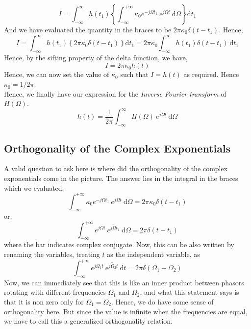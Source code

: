 \[
I = \int_{-\infty}^{\infty} \! h(t_1) \left\lbrace \int_{-\infty}^{+\infty} \! \kappa_0 e^{-j\Omega t_1} \  e^{j\Omega t} \ \mathrm{d}\Omega \right\rbrace \mathrm{d}t_1
\]
And we have evaluated the quantity in the braces to be $2\pi\kappa_0\delta(t-t_1)$. Hence,
\[
I = \int_{-\infty}^{\infty} \! h(t_1)\left\lbrace 2\pi\kappa_0\delta(t-t_1) \right\rbrace \mathrm{d}t_1 = 2\pi\kappa_0 \int_{-\infty}^{\infty} \! h(t_1) \delta(t-t_1)\ \mathrm{d}t_1
\]
Hence, by the sifting property of the delta function, we have,
\[
I = 2\pi\kappa_0 h(t)
\]
Hence, we can now set the value of $\kappa_0$ such that $I = h(t)$ as required. Hence $\kappa_0 = 1/2\pi$.\\
Hence, we finally have our expression for the \emph{Inverse Fourier transform} of $H(\Omega)$.
\[
h(t) = \frac{1}{2\pi}\int_{-\infty}^{\infty} \! H(\Omega)\  e^{j\Omega t} \ \mathrm{d}\Omega
\]
\subsection{Orthogonality of the Complex Exponentials}
A valid question to ask here is where did the orthogonality of the complex exponentials come in the picture. The answer lies in the integral in the braces which we evaluated.
\[
\int_{-\infty}^{+\infty} \! \kappa_0 e^{-j\Omega t_1} \  e^{j\Omega t} \ \mathrm{d}\Omega = 2\pi\kappa_0 \delta(t-t_1)
\]
or,
\[
\int_{-\infty}^{+\infty} \! e^{j\Omega t} \ \overline{e^{j\Omega t_1}} \ \mathrm{d}\Omega = 2\pi \delta(t-t_1)
\]
where the bar indicates complex conjugate. Now, this can be also written by renaming the variables, treating $t$ as the independent variable, as
\[
\int_{-\infty}^{+\infty} \! e^{j\Omega_1 t} \ \overline{e^{j\Omega_2 t}} \ \mathrm{d}t = 2\pi \delta(\Omega_1-\Omega_2)
\]
Now, we can immediately see that this is like an inner product between phasors rotating with different frequencies $\Omega_1$ and $\Omega_2$, and what this statement says is that it is non zero only for $\Omega_1=\Omega_2$. Hence, we do have some sense of orthogonality here. But since the value is infinite when the frequencies are equal, we have to call this a generalized orthogonality relation.
